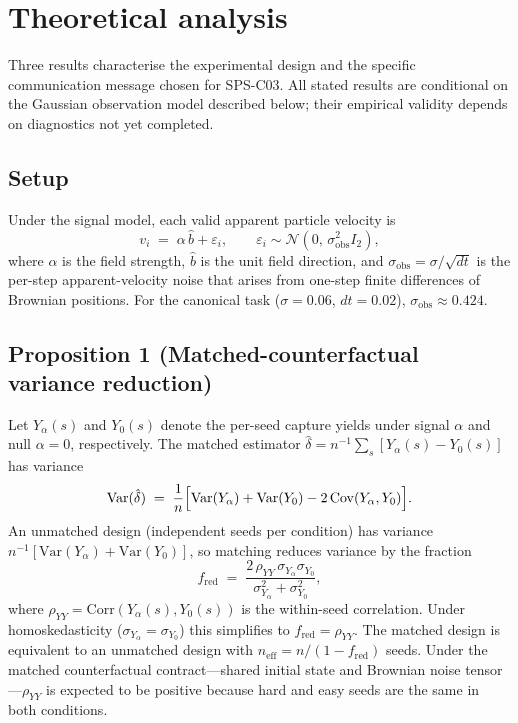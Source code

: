 \documentclass{article}
\begin{document}
\section{Theoretical analysis}

Three results characterise the experimental design and the specific communication
message chosen for SPS-C03.  All stated results are conditional on the Gaussian
observation model described below; their empirical validity depends on diagnostics
not yet completed.

\subsection*{Setup}

Under the signal model, each valid apparent particle velocity is
\[
  v_i \;=\; \alpha\,\hat{b} + \varepsilon_i, \qquad
  \varepsilon_i \sim \mathcal{N}\!\left(0,\, \sigma_{\mathrm{obs}}^2 I_2\right),
\]
where $\alpha$ is the field strength, $\hat{b}$ is the unit field direction, and
$\sigma_{\mathrm{obs}} = \sigma/\!\sqrt{dt}$ is the per-step apparent-velocity
noise that arises from one-step finite differences of Brownian positions.  For the
canonical task ($\sigma=0.06$, $dt=0.02$), $\sigma_{\mathrm{obs}} \approx 0.424$.

\subsection*{Proposition 1 (Matched-counterfactual variance reduction)}

Let $Y_\alpha(s)$ and $Y_0(s)$ denote the per-seed capture yields under signal
$\alpha$ and null $\alpha=0$, respectively.  The matched estimator
$\hat{\delta} = n^{-1}\!\sum_s [Y_\alpha(s) - Y_0(s)]$ has variance
\[
  \mathrm{Var}(\hat{\delta})
  \;=\; \frac{1}{n}\Bigl[\mathrm{Var}(Y_\alpha) + \mathrm{Var}(Y_0)
                         - 2\,\mathrm{Cov}(Y_\alpha,Y_0)\Bigr].
\]
An unmatched design (independent seeds per condition) has variance
$n^{-1}[\mathrm{Var}(Y_\alpha)+\mathrm{Var}(Y_0)]$, so matching reduces variance
by the fraction
\[
  f_{\mathrm{red}} \;=\; \frac{2\,\rho_{YY}\,\sigma_{Y_\alpha}\sigma_{Y_0}}
                              {\sigma_{Y_\alpha}^2 + \sigma_{Y_0}^2},
\]
where $\rho_{YY} = \mathrm{Corr}(Y_\alpha(s), Y_0(s))$ is the within-seed
correlation.  Under homoskedasticity ($\sigma_{Y_\alpha}=\sigma_{Y_0}$) this
simplifies to $f_{\mathrm{red}}=\rho_{YY}$.  The matched design is equivalent
to an unmatched design with $n_{\mathrm{eff}} = n/(1-f_{\mathrm{red}})$ seeds.
Under the matched counterfactual contract---shared initial state and Brownian
noise tensor---$\rho_{YY}$ is expected to be positive because hard and easy seeds
are the same in both conditions.
\end{document}
